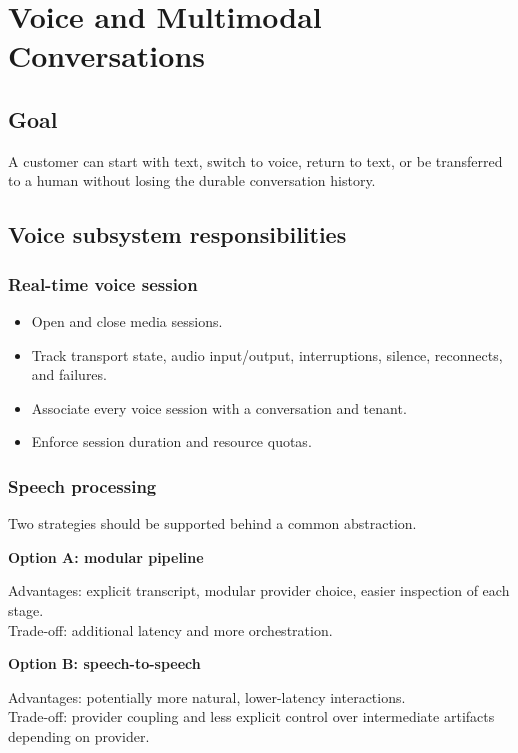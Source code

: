 \chapter{Voice and Multimodal Conversations}

\section{Goal}

A customer can start with text, switch to voice, return to text, or be transferred to a human without losing the durable conversation history.

\section{Voice subsystem responsibilities}

\subsection{Real-time voice session}

\begin{itemize}
\item Open and close media sessions.
\item Track transport state, audio input/output, interruptions, silence, reconnects, and failures.
\item Associate every voice session with a conversation and tenant.
\item Enforce session duration and resource quotas.
\end{itemize}
\subsection{Speech processing}

Two strategies should be supported behind a common abstraction.

\textbf{Option A: modular pipeline} 

Advantages: explicit transcript, modular provider choice, easier inspection of each stage. \\ Trade-off: additional latency and more orchestration.

\textbf{Option B: speech-to-speech} 

Advantages: potentially more natural, lower-latency interactions. \\ Trade-off: provider coupling and less explicit control over intermediate artifacts depending on provider.

